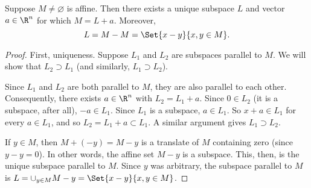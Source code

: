 \begin{proposition}
Suppose $M \neq \varnothing$ is affine.
Then there exists a unique subspace $L$ and vector $a \in \R ^n$ for which $M = L + a$.
Moreover,
  \[
L = M - M = \Set{x - y}{x,y \in M}.
  \]
\end{proposition}
\begin{proof}
First, uniqueness.
Suppose $L_1$ and $L_2$ are subspaces parallel to $M$.
We will show that $L_2 \supset L_1$ (and similarly, $L_1 \supset L_2$).

Since $L_1$ and $L_2$ are both parallel to $M$, they are also parallel to each other.
Consequently, there exists $a \in \R ^n$ with $L_2 = L_1 + a$.
Since $0 \in L_2$ (it is a subspace, after all), $-a \in L_1$.
Since $L_1$ is a subspace, $a \in L_1$.
So $x + a \in L_1$ for every $a \in L_1$, and so $L_2 = L_1 + a \subset L_1$.
A similar argument gives $L_1 \supset L_2$.

If $y \in M$, then $M + (-y) = M - y$ is a translate of $M$ containing zero (since $y - y = 0$).
In other words, the affine set $M - y$ is a subspace.
This, then, is the unique subspace parallel to $M$.
Since $y$ was arbitrary, the subspace parallel to $M$ is $L = \cup_{y \in M} M - y = \Set{x - y}{x,y \in M}$.

\end{proof}